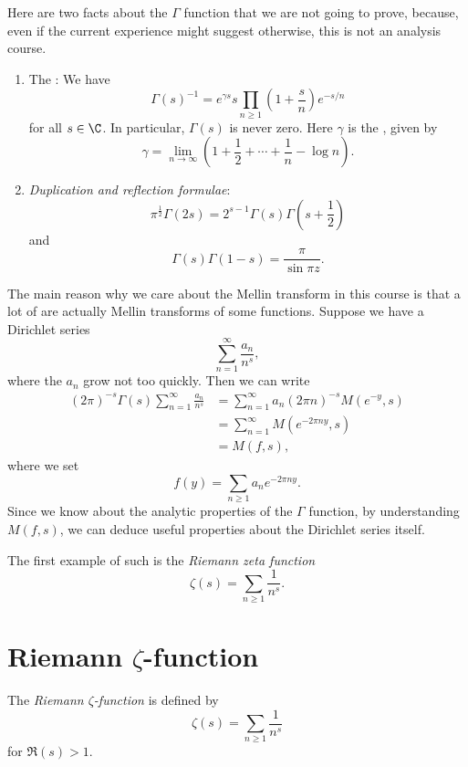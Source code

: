 \documentclass[a4paper]{article}
\begin{document}
Here are two facts about the $\Gamma$ function that we are not going to prove, because, even if the current experience might suggest otherwise, this is not an analysis course.
\begin{prop}\leavevmode
  \begin{enumerate}
    \item The : We have
      \[
        \Gamma(s)^{-1} = e^{\gamma s} s \prod_{n \geq 1} \left(1 + \frac{s}{n}\right) e^{-s/n}
      \]
      for all $s \in \C$. In particular, $\Gamma(s)$ is never zero. Here $\gamma$ is the , given by
      \[
        \gamma = \lim_{n \to \infty}\left(1 + \frac{1}{2} + \cdots + \frac{1}{n} - \log n\right).
      \]
    \item \emph{Duplication and reflection formulae}:
      \[
        \pi^{\frac{1}{2}} \Gamma(2s) = 2^{s - 1} \Gamma(s) \Gamma\left(s + \frac{1}{2}\right)
      \]
      and
      \[
        \Gamma(s) \Gamma(1 - s) = \frac{\pi}{\sin \pi z}.
      \]
  \end{enumerate}
\end{prop}

The main reason why we care about the Mellin transform in this course is that a lot of  are actually Mellin transforms of some functions. Suppose we have a Dirichlet series
\[
  \sum_{n = 1}^\infty \frac{a_n}{n^s},
\]
where the $a_n$ grow not too quickly. Then we can write
\begin{align*}
  (2\pi)^{-s} \Gamma(s)\sum_{n = 1}^\infty \frac{a_n}{n^s} &= \sum_{n = 1}^\infty a_n (2\pi n)^{-s} M(e^{-y}, s)\\
  &= \sum_{n = 1}^\infty M(e^{-2 \pi n y}, s) \\
  &= M(f, s),
\end{align*}
where we set
\[
  f(y) = \sum_{n \geq 1} a_n e^{-2\pi n y}.
\]
Since we know about the analytic properties of the $\Gamma$ function, by understanding $M(f, s)$, we can deduce useful properties about the Dirichlet series itself.

The first example of such is the \emph{Riemann zeta function}
\[
  \zeta(s) = \sum_{n \geq 1} \frac{1}{n^s}.
\]

\section{Riemann \texorpdfstring{$\zeta$}{zeta}-function}
\begin{defi}
  The \emph{Riemann $\zeta$-function} is defined by
  \[
    \zeta(s) = \sum_{n \geq 1} \frac{1}{n^s}
  \]
  for $\Re(s) > 1$.
\end{defi}
\end{document}
